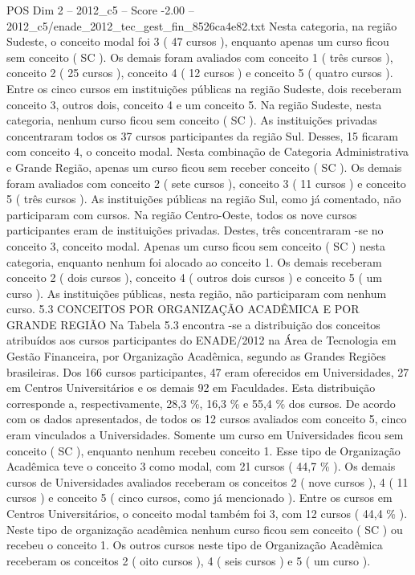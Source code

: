 \begin{textsample}{POS Dim 2 – 2012\_c5 – Score -2.00 – 2012\_c5/enade\_2012\_tec\_gest\_fin\_8526ca4e82.txt}
Nesta categoria, na região Sudeste, o conceito modal foi 3 ( 47 cursos ), enquanto apenas um curso ficou sem conceito ( SC ).
Os demais foram avaliados com conceito 1 ( três cursos ), conceito 2 ( 25 cursos ), conceito 4 ( 12 cursos ) e conceito 5 ( quatro cursos ).
Entre os cinco cursos em instituições públicas na região Sudeste, dois receberam conceito 3, outros dois, conceito 4 e um conceito 5.
Na região Sudeste, nesta categoria, nenhum curso ficou sem conceito ( SC ).
As instituições privadas concentraram todos os 37 cursos participantes da região Sul.
Desses, 15 ficaram com conceito 4, o conceito modal.
Nesta combinação de Categoria Administrativa e Grande Região, apenas um curso ficou sem receber conceito ( SC ).
Os demais foram avaliados com conceito 2 ( sete cursos ), conceito 3 ( 11 cursos ) e conceito 5 ( três cursos ).
As instituições públicas na região Sul, como já comentado, não participaram com cursos.
Na região Centro-Oeste, todos os nove cursos participantes eram de instituições privadas.
Destes, três concentraram -se no conceito 3, conceito modal.
Apenas um curso ficou sem conceito ( SC ) nesta categoria, enquanto nenhum foi alocado ao conceito 1.
Os demais receberam conceito 2 ( dois cursos ), conceito 4 ( outros dois cursos ) e conceito 5 ( um curso ).
As instituições públicas, nesta região, não participaram com nenhum curso. 5.3 CONCEITOS POR ORGANIZAÇÃO ACADÊMICA E POR GRANDE REGIÃO Na Tabela 5.3 encontra -se a distribuição dos conceitos atribuídos aos cursos participantes do ENADE/2012 na Área de Tecnologia em Gestão Financeira, por Organização Acadêmica, segundo as Grandes Regiões brasileiras.
Dos 166 cursos participantes, 47 eram oferecidos em Universidades, 27 em Centros Universitários e os demais 92 em Faculdades.
Esta distribuição corresponde a, respectivamente, 28,3 \%, 16,3 \% e 55,4 \% dos cursos.
De acordo com os dados apresentados, de todos os 12 cursos avaliados com conceito 5, cinco eram vinculados a Universidades.
Somente um curso em Universidades ficou sem conceito ( SC ), enquanto nenhum recebeu conceito 1.
Esse tipo de Organização Acadêmica teve o conceito 3 como modal, com 21 cursos ( 44,7 \% ).
Os demais cursos de Universidades avaliados receberam os conceitos 2 ( nove cursos ), 4 ( 11 cursos ) e conceito 5 ( cinco cursos, como já mencionado ).
Entre os cursos em Centros Universitários, o conceito modal também foi 3, com 12 cursos ( 44,4 \% ).
Neste tipo de organização acadêmica nenhum curso ficou sem conceito ( SC ) ou recebeu o conceito 1.
Os outros cursos neste tipo de Organização Acadêmica receberam os conceitos 2 ( oito cursos ), 4 ( seis cursos ) e 5 ( um curso ).

\end{textsample}
